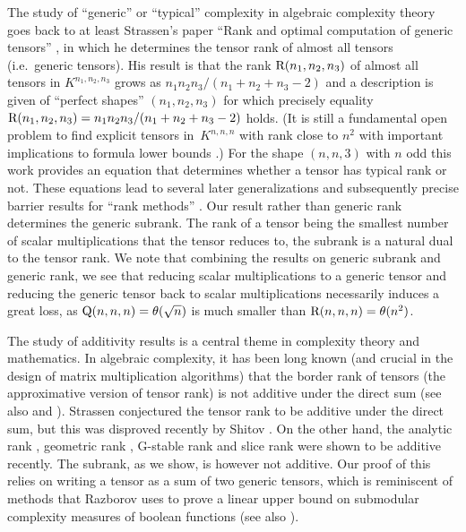 \documentclass[11pt]{article}
\theoremstyle{definition}
\theoremstyle{remark}
\newcommand{\trk}{{\rm R}}
\newcommand{\gensubrank}{{\rm Q}}
\begin{document}
The study of ``generic'' or ``typical'' complexity in algebraic complexity theory goes back to at least Strassen's paper ``Rank and optimal computation of generic tensors'' \cite{MR709378}, in which he determines the tensor rank of almost all tensors (i.e.~generic tensors). His result is that the rank $\trk(n_1,n_2,n_3)$ of almost all tensors in $K^{n_1,n_2,n_3}$ grows as $n_1 n_2 n_3/ (n_1 + n_2 + n_3 - 2)$ and a description is given of ``perfect shapes'' $(n_1, n_2, n_3)$ for which precisely equality $\trk(n_1,n_2,n_3) = n_1 n_2 n_3/ (n_1 + n_2 + n_3 - 2)$ holds. (It is still a fundamental open problem to find explicit tensors in~$K^{n,n,n}$ with rank close to $n^2$ \cite{blaser2014explicit} with important implications to formula lower bounds \cite{raz2013tensor}.) For the shape $(n,n,3)$ with $n$ odd this work provides an equation that determines whether a tensor has typical rank or not. These equations lead to several later generalizations \cite{MR3081636,koiran2020tensor} and subsequently precise barrier results for ``rank methods'' \cite{efremenko2017barriers,DBLP:conf/focs/GargMOW19}. Our result rather than generic rank determines the generic subrank. The rank of a tensor being the smallest number of scalar multiplications that the tensor reduces to, the subrank is a natural dual to the tensor rank. We note that combining the results on generic subrank and generic rank, we see that reducing scalar multiplications to a generic tensor and reducing the generic tensor back to scalar multiplications necessarily induces a great loss, as $\gensubrank(n,n,n) = \theta(\sqrt{n})$ is much smaller than $\trk(n,n,n) = \theta(n^2)$.

%

The study of additivity results is a central theme in complexity theory and mathematics. In algebraic complexity, it has been long known (and crucial in the design of matrix multiplication algorithms) that the border rank of tensors (the approximative version of tensor rank) is not additive under the direct sum \cite{schonhage1981partial} (see also \cite[Lemma~7.1]{blaser2013fast} and \cite[(15.12)]{burgisser1997algebraic}). Strassen conjectured the tensor rank to be additive under the direct sum, but this was disproved recently by Shitov \cite{MR3974478}. On the other hand, the analytic rank \cite{lovett2019analytic}, geometric rank \cite{DBLP:conf/coco/KoppartyMZ20}, G-stable rank \cite{derksen2020gstable} and slice rank \cite{gowers2021slice} were shown to be additive recently. The subrank, as we show, is however not additive. Our proof of this relies on writing a tensor as a sum of two generic tensors, which is reminiscent of methods that Razborov \cite{razborov1992submodular} uses to prove a linear upper bound on submodular complexity measures of boolean functions (see also \cite{DBLP:journals/eccc/RobereZ21}).
\end{document}
